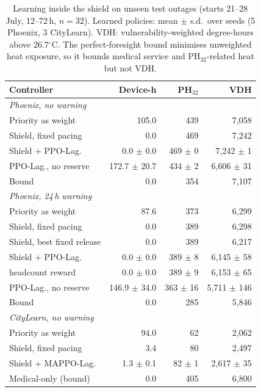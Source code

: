 \begin{table}[t]
\centering
\caption{Learning inside the shield on unseen test outages (starts 21--28 July, 12--72\,h, $n=32$). Learned policies: mean $\pm$ s.d.\ over seeds (5 Phoenix, 3 CityLearn). VDH: vulnerability-weighted degree-hours above 26.7$^\circ$C. The perfect-foresight bound minimises unweighted heat exposure, so it bounds medical service and PH$_{32}$-related heat but not VDH.}
\label{tab:learning}
\setlength{\tabcolsep}{2.5pt}
\begin{tabular}{lrrr}
\toprule
Controller & Device-h & PH$_{32}$ & VDH \\
\midrule
\multicolumn{4}{l}{\textit{Phoenix, no warning}} \\
Priority as weight & 105.0 & 439 & 7{,}058 \\
Shield, fixed pacing & 0.0 & 469 & 7{,}242 \\
Shield + PPO-Lag. & 0.0 $\pm$ 0.0 & 469 $\pm$ 0 & 7{,}242 $\pm$ 1 \\
PPO-Lag., no reserve & 172.7 $\pm$ 20.7 & 434 $\pm$ 2 & 6{,}606 $\pm$ 31 \\
Bound & 0.0 & 354 & 7{,}107 \\
\midrule \multicolumn{4}{l}{\textit{Phoenix, 24\,h warning}} \\
Priority as weight & 87.6 & 373 & 6{,}299 \\
Shield, fixed pacing & 0.0 & 389 & 6{,}298 \\
Shield, best fixed release & 0.0 & 389 & 6{,}217 \\
Shield + PPO-Lag. & 0.0 $\pm$ 0.0 & 389 $\pm$ 8 & 6{,}145 $\pm$ 58 \\
\quad headcount reward & 0.0 $\pm$ 0.0 & 389 $\pm$ 9 & 6{,}153 $\pm$ 65 \\
PPO-Lag., no reserve & 146.9 $\pm$ 34.0 & 363 $\pm$ 16 & 5{,}711 $\pm$ 146 \\
Bound & 0.0 & 285 & 5{,}846 \\
\midrule \multicolumn{4}{l}{\textit{CityLearn, no warning}} \\
Priority as weight & 94.0 & 62 & 2{,}062 \\
Shield, fixed pacing & 3.4 & 80 & 2{,}497 \\
Shield + MAPPO-Lag. & 1.3 $\pm$ 0.1 & 82 $\pm$ 1 & 2{,}617 $\pm$ 35 \\
Medical-only (bound) & 0.0 & 405 & 6{,}800 \\
\bottomrule
\end{tabular}
\end{table}
